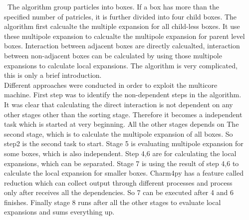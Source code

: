 \documentclass[final,t]{beamer}
\begin{document}
\begin{frame}[fragile]{}
\begin{columns}[t]
\begin{column}{.45\linewidth}
      \begin{tcolorbox}[toplevelbox,adjusted title=Tech Detail 1]
        \ The algorithm group particles into boxes. If a box has more than the specified
        number of patricles, it is further divided into four child boxes. The algorithm first calcualte the multiple expansion for all child-less boxes. It use these
        multipole expansion to calcualte the multipole expansion for parent level boxes.
        Interaction between adjacent boxes are directly calcualted, interaction between
        non-adjacent boxes can be calculated by using those multipole expansions to calculate local expansions. The algorithm is very complicated, this is only a brief introduction.
        \\ Different approaches were conducted in order to exploit the multicore machine.
        First step was to identify the non-dependent steps in the algorithm. It was clear that calculating the direct interaction is not dependent on any other stages other
        than the sorting stage. Therefore it becomes a independent task which is started at very beginning. All the other stages depends on The second stage, which is to calculate the multipole expansion of all boxes. So step2 is the second task to start. Stage 5 is evaluating multipole expansion for some boxes, which is also independent. Step 4,6 are for calculating the local expansions, which can be separated. Stage 7 is using the result of step 4,6 to calculate the local expansion for smaller boxes. Charm4py has a feature called reduction which can
        collect output through different processes and process only after receives all
        the dependencies. So 7 can be executed after 4 and 6 finishes. Finally stage
        8 runs after all the other stages to evaluate local expansions and sums everything
        up.
      \end{tcolorbox}

    \end{column}



    \begin{column}{.45\linewidth}
      \begin{tcolorbox}[toplevelbox,adjusted title=Tech Detail 2]
        \lipsum[5]
      \end{tcolorbox}

      \begin{tcolorbox}[toplevelbox,adjusted title=Results]
        \lipsum[6-7]
      \end{tcolorbox}

      \begin{tcolorbox}[toplevelbox,adjusted title=References]
        \lipsum[8]
      \end{tcolorbox}

    \end{column}


  \end{columns}
\end{frame}
\end{document}

